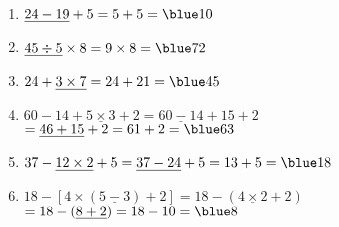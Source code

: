    \ \\ [-5mm]
   \begin{enumerate}
      \item $\underline{24-19}+5 =5+5 =\blue 10$ \smallskip
      \item $\underline{45\div5}\times8 =9\times8 =\blue 72$ \smallskip
      \item $24+\underline{3\times7} =24+21 =\blue 45$ \smallskip
      \item $60-14+\underline{5\times3}+2 =\underline{60-14}+15+2$ \\
         \hspace*{33mm} $=\underline{46+15}+2 =61+2 =\blue 63$
      \item $37-\underline{12\times2}+5 =\underline{37-24}+5 =13+5 =\blue 18$ \smallskip
      \item $18-[4\times(\underline{5-3})+2] =18-(\underline{4\times2}+2)$ \\
         \hspace*{30mm} $=18-(\underline{8+2}) =18-10 =\blue 8$
   \end{enumerate}
